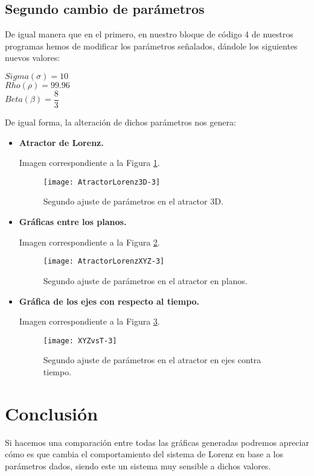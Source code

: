 \subsection{Segundo cambio de parámetros}

De igual manera que en el primero, en nuestro bloque de código 4 de nuestros programas hemos de modificar los parámetros señalados, dándole los siguientes nuevos valores:

\begin{center}
	$ Sigma ( \sigma ) = 10 $ \\
    $ Rho ( \rho ) = 99.96 $ \\
    $ Beta ( \beta ) = \dfrac{8}{3} $
\end{center}

De igual forma, la alteración de dichos parámetros nos genera:

\begin{itemize}
\item \textbf{Atractor de Lorenz.}

Imagen correspondiente a la Figura \ref{fig26:SeguAjus-A}.

\begin{figure}[h!]
	\begin{center}
		\texttt{[image: AtractorLorenz3D-3]}
        \caption{Segundo ajuste de parámetros en el atractor 3D.}
        \label{fig26:SeguAjus-A}
	\end{center}
\end{figure}

\item \textbf{Gráficas entre los planos.}

Imagen correspondiente a la Figura \ref{fig27:SeguAjus-B}.

\begin{figure}[h!]
	\begin{center}
		\texttt{[image: AtractorLorenzXYZ-3]}
        \caption{Segundo ajuste de parámetros en el atractor en planos.}
        \label{fig27:SeguAjus-B}
	\end{center}
\end{figure}

\item \textbf{Gráfica de los ejes con respecto al tiempo.}

Imagen correspondiente a la Figura \ref{fig28:SeguAjus-C}.

\begin{figure}[h!]
	\begin{center}
		\texttt{[image: XYZvsT-3]}
        \caption{Segundo ajuste de parámetros en el atractor en ejes contra tiempo.}
        \label{fig28:SeguAjus-C}
	\end{center}
\end{figure}

\end{itemize}

\section{Conclusión}

Si hacemos una comparación entre todas las gráficas generadas podremos apreciar cómo es que cambia el comportamiento del sistema de Lorenz en base a los parámetros dados, siendo este un sistema muy sensible a dichos valores.

